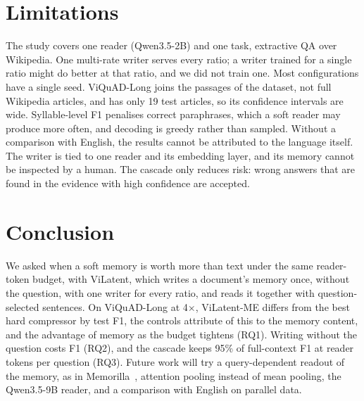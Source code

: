 \section{Limitations}
\label{sec:limits}
The study covers one reader (Qwen3.5-2B) and one task, extractive QA over Wikipedia.
One multi-rate writer serves every ratio; a writer trained for a single ratio might do better at that ratio, and we did not train one.
Most configurations have a single seed.
ViQuAD-Long joins the passages of the dataset, not full Wikipedia articles, and has only 19 test articles, so its confidence intervals are wide.
Syllable-level F1 penalises correct paraphrases, which a soft reader may produce more often, and decoding is greedy rather than sampled.
Without a comparison with English, the results cannot be attributed to the language itself.
The writer is tied to one reader and its embedding layer, and its memory cannot be inspected by a human.
The cascade only reduces risk: wrong answers that are found in the evidence with high confidence are accepted.

\section{Conclusion}
\label{sec:conclusion}
We asked when a soft memory is worth more than text under the same reader-token budget, with ViLatent, which writes a document's memory once, without the question, with one writer for every ratio, and reads it together with question-selected sentences.
On ViQuAD-Long at 4$\times$, ViLatent-ME differs from the best hard compressor by \tbd{} test F1, the controls attribute \tbd{} of this to the memory content, and the advantage of memory \tbd{} as the budget tightens (RQ1).
Writing without the question costs \tbd{} F1 (RQ2), and the cascade keeps 95\% of full-context F1 at \tbd{} reader tokens per question (RQ3).
Future work will try a query-dependent readout of the memory, as in Memorilla~\cite{fallahpour2026memorilla}, attention pooling instead of mean pooling, the Qwen3.5-9B reader, and a comparison with English on parallel data.
